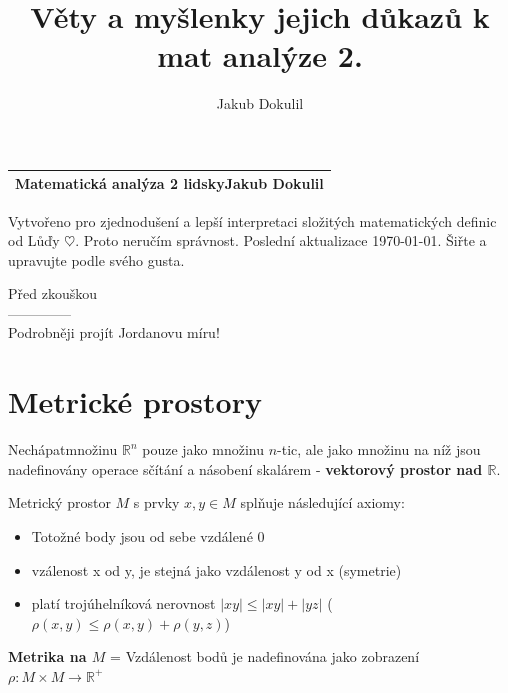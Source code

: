 \documentclass[a4paper, twoside,%
12pt]{article}
\author{Jakub Dokulil}
\title{Věty a myšlenky jejich důkazů k mat analýze 2.}
\newcommand{\R}{\mathbb{R}}
\begin{document}
\begin{table}[h!]
\begin{tabular}{p{}}
    \textsf{\huge{Matematická analýza 2 lidsky}}\newline \textsf{\textbf{\Large Jakub Dokulil}}\\
    \hline
\end{tabular}
\end{table}

\noindent\textsf{Vytvořeno pro zjednodušení a lepší interpretaci složitých matematických definic od Lůďy $\heartsuit$. Proto neručím správnost. Poslední aktualizace \today. Šiřte a upravujte podle svého gusta.}

\textsf{
    Před zkouškou\\
    --------------\\
    Podrobněji projít Jordanovu míru!
}

\tableofcontents

\section{Metrické prostory}

Nechápatmnožinu $\R ^n$ pouze jako množinu $n$-tic, ale jako množinu na níž jsou nadefinovány operace sčítání a násobení skalárem - \textbf{vektorový prostor nad $\R$}.

Metrický prostor $M$ s prvky $x,y \in M$ splňuje následující axiomy:
\begin{itemize}
    \item Totožné body jsou od sebe vzdálené 0
    \item vzálenost x od y, je stejná jako vzdálenost y od x (symetrie)
    \item platí trojúhelníková nerovnost $|xy|\leq |xy| + |yz| $ ($\rho(x,y)\leq \rho(x,y) + \rho(y,z) $)
\end{itemize}
\textbf{Metrika na $M$} = Vzdálenost bodů je nadefinována jako zobrazení $\rho: M\times M \rightarrow \R^+$
\end{document}
